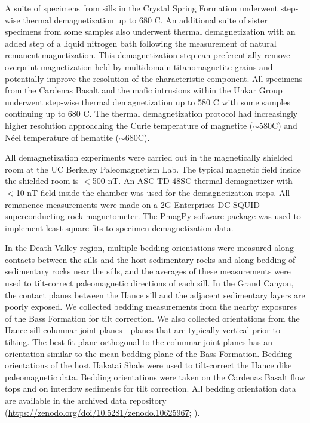\documentclass[draft]{agujournal2019}
\begin{document}
A suite of specimens from sills in the Crystal Spring Formation underwent step-wise thermal demagnetization up to 680 \textdegree C. An additional suite of sister specimens from some samples also underwent thermal demagnetization with an added step of a liquid nitrogen bath following the measurement of natural remanent magnetization. This demagnetization step can preferentially remove overprint magnetization held by multidomain titanomagnetite grains and potentially improve the resolution of the characteristic component. All specimens from the Cardenas Basalt and the mafic intrusions within the Unkar Group underwent step-wise thermal demagnetization up to 580 \textdegree C with some samples continuing up to 680 \textdegree C. The thermal demagnetization protocol had increasingly higher resolution approaching the Curie temperature of magnetite ($\sim$580\textdegree C) and N\'eel temperature of hematite ($\sim$680\textdegree C).

All demagnetization experiments were carried out in the magnetically shielded room at the UC Berkeley Paleomagnetism Lab. The typical magnetic field inside the shielded room is $<$500 nT. An ASC TD-48SC thermal demagnetizer with $<$10 nT field inside the chamber was used for the demagnetization steps. All remanence measurements were made on a 2G Enterprises DC-SQUID superconducting rock magnetometer. The PmagPy software package \cite{Tauxe2016a} was used to implement least-square fits \cite{Kirschvink1980a} to specimen demagnetization data. 

In the Death Valley region, multiple bedding orientations were measured along contacts between the sills and the host sedimentary rocks and along bedding of sedimentary rocks near the sills, and the averages of these measurements were used to tilt-correct paleomagnetic directions of each sill. In the Grand Canyon, the contact planes between the Hance sill and the adjacent sedimentary layers are poorly exposed. We collected bedding measurements from the nearby exposures of the Bass Formation for tilt correction. We also collected orientations from the Hance sill columnar joint planes---planes that are typically vertical prior to tilting. The best-fit plane orthogonal to the columnar joint planes has an orientation similar to the mean bedding plane of the Bass Formation. Bedding orientations of the host Hakatai Shale were used to tilt-correct the Hance dike paleomagnetic data. Bedding orientations were taken on the Cardenas Basalt flow tops and on interflow sediments for tilt correction. All bedding orientation data are available in the archived data repository (\url{https://zenodo.org/doi/10.5281/zenodo.10625967}; ).
\end{document}
